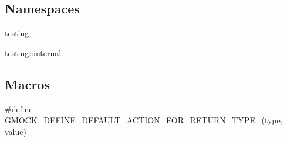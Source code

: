 \subsection*{Namespaces}
\begin{DoxyCompactItemize}
\item 
 \mbox{\hyperlink{namespacetesting}{testing}}
\item 
 \mbox{\hyperlink{namespacetesting_1_1internal}{testing\+::internal}}
\end{DoxyCompactItemize}
\subsection*{Macros}
\begin{DoxyCompactItemize}
\item 
\#define \mbox{\hyperlink{_obj__test_2lib_2googletest-release-1_88_81_2googlemock_2include_2gmock_2gmock-actions_8h_a06b1e6cd1145acf7849e4a112976016b}{G\+M\+O\+C\+K\+\_\+\+D\+E\+F\+I\+N\+E\+\_\+\+D\+E\+F\+A\+U\+L\+T\+\_\+\+A\+C\+T\+I\+O\+N\+\_\+\+F\+O\+R\+\_\+\+R\+E\+T\+U\+R\+N\+\_\+\+T\+Y\+P\+E\+\_\+}}(type,  \mbox{\hyperlink{_obj__test_2lib_2googletest-master_2googlemock_2test_2gmock-matchers__test_8cc_a337b8a670efc0b086ad3af163f3121b6}{value}})
\end{DoxyCompactItemize}
